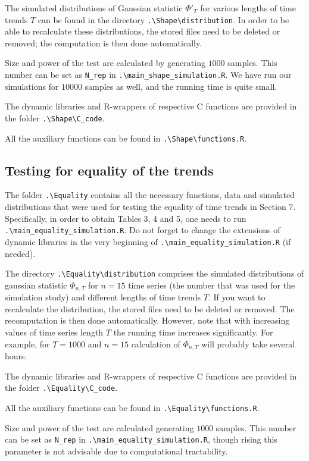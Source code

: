 \documentclass[a4paper,12pt]{article}
\begin{document}
The simulated distributions of Gaussian statistic $\Phi'_{T}$ for various lengths of time trends $T$ can be found in the directory \verb|.\Shape\distribution|. In order to be able to recalculate these distributions, the stored files need to be deleted or removed; the computation is then done automatically.


Size and power of the test are calculated by generating $1000$ samples. This number can be set as \verb|N_rep| in \verb|.\main_shape_simulation.R|. We have run our simulations for $10000$ samples as well, and the running time is quite small.


The dynamic libraries and R-wrappers of respective C functions are provided in the folder \verb|.\Shape\C_code|.

All the auxiliary functions can be found in \verb|.\Shape\functions.R|.


\subsection{Testing for equality of the trends}
The folder \verb|.\Equality| contains all the necessary functions, data and simulated distributions that were used for testing the equality of time trends in Section 7. Specifically, in order to obtain Tables 3, 4 and 5, one needs to run \verb|.\main_equality_simulation.R|. Do not forget to change the extensions of dynamic libraries in the very beginning of \verb|.\main_equality_simulation.R| (if needed).

The directory \verb|.\Equality\distribution| comprises the simulated distributions of gaussian statistic $\Phi_{n, T}$ for $n= 15$ time series (the number that was used for the simulation study) and different lengths of time trends $T$. If you want to recalculate the distribution, the stored files need to be deleted or removed. The recomputation is then done automatically. However, note that with increasing values of time series length $T$ the running time increases significantly. For example, for $T = 1000$ and $n = 15$ calculation of $\Phi_{n, T}$ will probably take several hours.


The dynamic libraries and R-wrappers of respective C functions are provided in the folder \verb|.\Equality\C_code|.


All the auxiliary functions can be found in \verb|.\Equality\functions.R|.


Size and power of the test are calculated generating $1000$ samples. This number can be set as \verb|N_rep| in \verb|.\main_equality_simulation.R|, though rising this parameter is not advisable due to computational tractability. 
\end{document}
